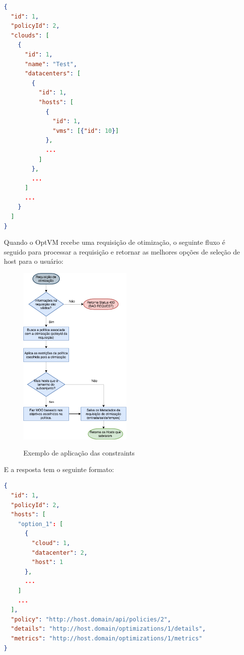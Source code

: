 \begin{lstlisting}[language=json,firstnumber=1]
{
  "id": 1,
  "policyId": 2,
  "clouds": [
    {
      "id": 1,
      "name": "Test",
      "datacenters": [
        {
          "id": 1,
          "hosts": [
            {
              "id": 1,
              "vms": [{"id": 10}]
            },
            ...
          ]
        },
        ...
      ]
      ...
    }
  ]
}
\end{lstlisting}

Quando o OptVM recebe uma requisição de otimização, o seguinte fluxo é seguido
para processar a requisição e retornar as melhores opções de seleção de host
para o usuário:

\begin{figure}[!htb]
  \centering
  \caption{Exemplo de aplicação das constraints}
  \includegraphics[width=0.5\textwidth]{./dados/figuras/fluxograma-otimizacao.png}
  \label{fig:fluxograma-otimizacao}
\end{figure}

E a resposta tem o seguinte formato:

\begin{lstlisting}[language=json,firstnumber=1]
{
  "id": 1,
  "policyId": 2,
  "hosts": [
    "option_1": [
      {
        "cloud": 1,
        "datacenter": 2,
        "host": 1
      },
      ...
    ] 
    ...
  ],
  "policy": "http://host.domain/api/policies/2",
  "details": "http://host.domain/optimizations/1/details",
  "metrics": "http://host.domain/optimizations/1/metrics"
}
\end{lstlisting}

